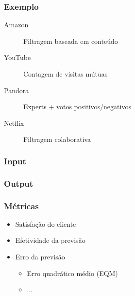 \begin{frame}
\frametitle{Exemplo}
\begin{description}
\item[Amazon] Filtragem baseada em conteúdo
\item[YouTube] Contagem de visitas mútuas
\item[Pandora] Experts + votos positivos/negativos
\item[Netflix] Filtragem colaborativa
\end{description}
\end{frame}

\begin{frame}
\frametitle{Input}
\end{frame}


\begin{frame}
\frametitle{Output}
\end{frame}


\begin{frame}
\frametitle{Métricas}
\begin{itemize}
\item Satisfação do cliente
\item Efetividade da previsão
\item Erro da previsão
\begin{itemize}
\item Erro quadrático médio (EQM)
\item ...
\end{itemize}
\end{itemize}
\end{frame}
